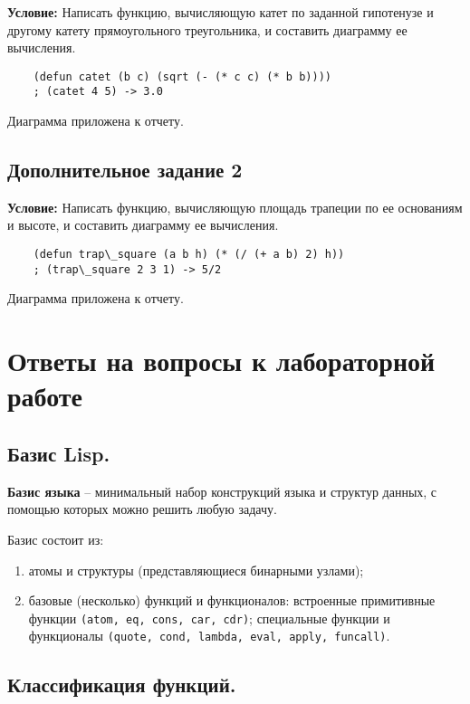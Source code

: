 \textbf{Условие:} Написать функцию, вычисляющую катет по заданной гипотенузе и другому катету прямоугольного треугольника, и составить диаграмму ее вычисления.

\begin{lstlisting}
	(defun catet (b c) (sqrt (- (* c c) (* b b))))
	; (catet 4 5) -> 3.0
\end{lstlisting}

Диаграмма приложена к отчету.


\section{Дополнительное задание 2}

\textbf{Условие:} Написать функцию, вычисляющую площадь трапеции по ее основаниям и высоте, и составить диаграмму ее вычисления.

\begin{lstlisting}
	(defun trap\_square (a b h) (* (/ (+ a b) 2) h))
	; (trap\_square 2 3 1) -> 5/2
\end{lstlisting}

Диаграмма приложена к отчету.




\chapter{Ответы на вопросы к лабораторной работе}

\section{Базис Lisp.}

\textbf{Базис языка} -- минимальный набор конструкций языка и структур данных, с помощью которых можно решить любую задачу.

Базис состоит из:
\begin{enumerate}
    \item атомы и структуры (представляющиеся бинарными узлами);
    \item базовые (несколько) функций и функционалов: встроенные примитивные функции \texttt{(atom, eq, cons, car, cdr)}; специальные функции и функционалы \texttt{(quote, cond, lambda, eval, apply, funcall)}.
\end{enumerate}


\section{Классификация функций.}

